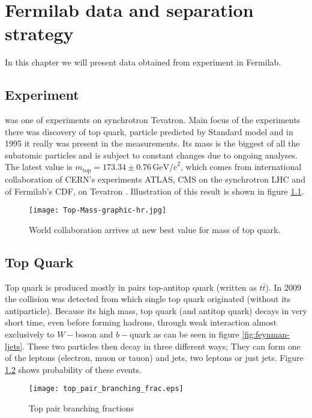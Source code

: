 \chapter{Fermilab data and separation strategy}

In this chapter we will present data obtained from experiment \dzero in Fermilab. 

\section{\dzero Experiment}
\dzero was one of experiments on synchrotron Tevatron. Main focus of the experiments there was discovery of top quark, particle predicted by Standard model and in 1995 it really was present in the measurements. Its mass is the biggest of all the subatomic particles and is subject to constant changes due to ongoing analyses. The latest value is $m_\mathrm{top} = 173.34 \pm 0.76 \,\mathrm{GeV/c}^2 $, which comes from international collaboration of CERN's experiments ATLAS, CMS on the synchrotron LHC and of Fermilab's CDF, \dzero on Tevatron \cite{jointMass}. Illustration of this result is shown in figure \ref{fig:jointMass}.

\begin{figure}[htb]
	\centering
	\texttt{[image: Top-Mass-graphic-hr.jpg]}
	\caption{World collaboration arrives at new best value for mass of top quark.}
	\label{fig:jointMass}
\end{figure}

\section{Top Quark}
Top quark is produced mostly in pairs top-antitop quark (written as $t\bar{t}$). In 2009 the collision was detected from which single top quark originated  (without its antiparticle). Because its high mass, top quark (and antitop quark) decays in very short time, even before forming hadrons, through weak interaction almost exclusively to $W-$boson and $b-$quark as can be seen in figure \ref{fig:feynman-ljets}. These two particles then decay in three different ways; They can form one of the leptons (electron, muon or tauon) and jets, two leptons or just jets. Figure \ref{fig:ttbarBranchingFrac} shows probability of these events. 

\begin{figure}[htb]
	\centering
	\texttt{[image: top\_pair\_branching\_frac.eps]}
	\caption{Top pair branching fractions}
	\label{fig:ttbarBranchingFrac}
\end{figure}

